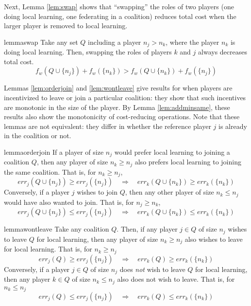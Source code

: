 \documentclass{article}
\newcommand{\ndraw}[0]{\ensuremath{n}}
\newcommand{\costw}[0]{\ensuremath{f_w}}
\begin{document}
Next, Lemma \ref{lem:swap} shows that \enquote{swapping} the roles of two players (one doing local learning, one federating in a coalition) reduces total cost when the larger player is removed to local learning. 

\begin{restatable}[Swapping]{lemma}{swap}
\label{lem:swap}
Take any set $Q$ including a player $\ndraw_j> \ndraw_k$, where the player $\ndraw_k$ is doing local learning. Then, swapping the roles of players $k$ and $j$ always decreases total cost. 
$$\costw(Q \cup \{\ndraw_j\}) + \costw(\{\ndraw_k\}) >\costw(Q \cup \{\ndraw_k\}) + \costw(\{\ndraw_j\})  $$
\end{restatable}

Lemmas \ref{lem:orderjoin} and \ref{lem:wontleave} give results for when players are incentivized to leave or join a particular coalition: they show that such incentives are monotonic in the size of the player. By Lemma \ref{lem:addminsame}, these results also show the monotonicity of cost-reducing operations. Note that these lemmas are not equivalent: they differ in whether the reference player $j$ is already in the coalition or not. 

\begin{restatable}{lemma}{orderjoin}
\label{lem:orderjoin}
If a player of size $\ndraw_j$ would prefer local learning to joining a coalition $Q$, then any player of size $\ndraw_k \geq \ndraw_j$ also prefers local learning to joining the same coalition. That is, for $\ndraw_k \geq \ndraw_j$,
$$err_j(Q\cup \{\ndraw_j\}) \geq err_j(\{\ndraw_j\}) \quad \Rightarrow \quad err_k(Q \cup \{\ndraw_k\}) \geq err_k(\{\ndraw_k\}) $$
Conversely, if a player $j$ wishes to join $Q$, then any other player of size $\ndraw_k \leq \ndraw_j$ would have also wanted to join. That is, for $\ndraw_j \geq \ndraw_k$, 
$$err_j(Q\cup \{\ndraw_j\}) \leq err_j(\{\ndraw_j\}) \quad \Rightarrow \quad err_k(Q \cup \{\ndraw_k\}) \leq err_k(\{\ndraw_k\}) $$
\end{restatable}


\begin{restatable}{lemma}{wontleave}
\label{lem:wontleave}
Take any coalition $Q$. Then, if any player $j \in Q$ of size $\ndraw_j$ wishes to leave $Q$ for local learning, then any player of size $\ndraw_k \geq \ndraw_j$ also wishes to leave for local learning. That is, for $\ndraw_k \geq \ndraw_j$
$$err_j(Q) \geq err_j(\{\ndraw_j\}) \quad \Rightarrow \quad err_k(Q) \geq err_k(\{\ndraw_k\})$$
Conversely, if a player $j \in Q$ of size $\ndraw_j$ does \emph{not} wish to leave $Q$ for local learning, then any player $k \in Q$ of size $\ndraw_k \leq \ndraw_j$ also does not wish to leave. That is, for $\ndraw_k \leq \ndraw_j$
$$err_j(Q) \leq err_j(\{\ndraw_j\}) \quad \Rightarrow \quad err_k(Q) \leq err_k(\{\ndraw_k\})$$
\end{restatable}
\end{document}

